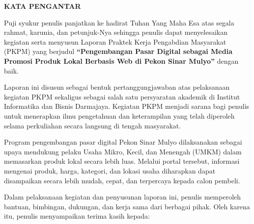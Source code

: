 \documentclass[12pt,a4paper]{article}
\newcommand{\headingfont}{\fontsize{14}{17}\selectfont}
\begin{document}
{}
\listoffigures

\clearpage

{}
\listoftables

\clearpage

{}

\begin{center}
    {
        \headingfont
        \bfseries
        KATA PENGANTAR
    }
\end{center}

\vspace{1cm}

Puji syukur penulis panjatkan ke hadirat Tuhan Yang Maha Esa atas
segala rahmat, karunia, dan petunjuk-Nya sehingga penulis dapat
menyelesaikan kegiatan serta menyusun Laporan Praktek Kerja
Pengabdian Masyarakat (PKPM) yang berjudul
\textbf{``Pengembangan Pasar Digital sebagai Media Promosi Produk
Lokal Berbasis Web di Pekon Sinar Mulyo''} dengan baik.

Laporan ini disusun sebagai bentuk pertanggungjawaban atas
pelaksanaan kegiatan PKPM sekaligus sebagai salah satu persyaratan
akademik di Institut Informatika dan Bisnis Darmajaya. Kegiatan
PKPM menjadi sarana bagi penulis untuk menerapkan ilmu pengetahuan
dan keterampilan yang telah diperoleh selama perkuliahan secara
langsung di tengah masyarakat.

Program pengembangan pasar digital Pekon Sinar Mulyo dilaksanakan
sebagai upaya mendukung pelaku Usaha Mikro, Kecil, dan Menengah
(UMKM) dalam memasarkan produk lokal secara lebih luas. Melalui
portal tersebut, informasi mengenai produk, harga, kategori, dan
lokasi usaha diharapkan dapat disampaikan secara lebih mudah, cepat,
dan terpercaya kepada calon pembeli.

Dalam pelaksanaan kegiatan dan penyusunan laporan ini, penulis
memperoleh bantuan, bimbingan, dukungan, dan kerja sama dari
berbagai pihak. Oleh karena itu, penulis menyampaikan terima kasih
kepada:
\end{document}
